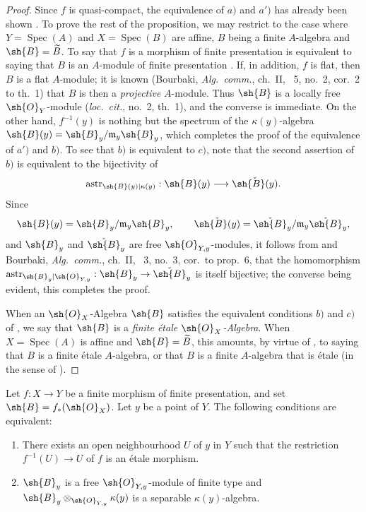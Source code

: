 \begin{proof}
Since $f$ is quasi-compact, the equivalence of $a)$ and $a')$ has already been shown .
To prove the rest of the proposition, we may restrict to the case where $Y=\operatorname{Spec}(A)$ and $X=\operatorname{Spec}(B)$ are affine, $B$ being a finite $A$-algebra and $\sh{B}=\widetilde{B}$.
To say that $f$ is a morphism of finite presentation is equivalent to saying that $B$ is an $A$-module of finite presentation .
If, in addition, $f$ is flat, then $B$ is a flat $A$-module; it is known (Bourbaki, \emph{Alg.\ comm.}, ch.~II, \textsection~5, no.~2, cor.~2 to th.~1) that $B$ is then a \emph{projective} $A$-module.  Thus $\sh{B}$ is a locally free $\sh{O}_Y$-module (\emph{loc.\ cit.}, no.~2, th.~1), and the converse is immediate.
On the other hand, $f^{-1}(y)$ is nothing but the spectrum of the $\kappa(y)$-algebra $\sh{B}(y)=\sh{B}_y/\mathfrak{m}_y\sh{B}_y$, which completes the proof of the equivalence of $a')$ and $b)$.
To see that $b)$ is equivalent to $c)$, note that the second assertion of $b)$ is equivalent to the bijectivity of
\[
 \operatorname{astr}_{\sh{B}(y)|\kappa(y)}:\sh{B}(y)\longrightarrow\check{\sh{B}(y)}.
\]
Since
\[
 \sh{B}(y)=\sh{B}_y/\mathfrak{m}_y\sh{B}_y,
 \qquad
 \check{\sh{B}(y)}=\check{\sh{B}}_y/\mathfrak{m}_y\check{\sh{B}}_y,
\]
and $\sh{B}_y$ and $\check{\sh{B}}_y$ are free $\sh{O}_{Y,y}$-modules, it follows from  and Bourbaki, \emph{Alg.\ comm.}, ch.~II, \textsection~3, no.~3, cor.\ to prop.~6, that the homomorphism $\operatorname{astr}_{\sh{B}_y|\sh{O}_{Y,y}}:\sh{B}_y\to\check{\sh{B}}_y$ is itself bijective;
the converse being evident, this completes the proof.

When an $\sh{O}_X$-Algebra $\sh{B}$ satisfies the equivalent conditions $b)$ and $c)$ of , we say that $\sh{B}$ is a \emph{finite \'etale $\sh{O}_X$-Algebra}.
When $X=\operatorname{Spec}(A)$ is affine and $\sh{B}=\widetilde{B}$, this amounts, by virtue of , to saying that $B$ is a finite \'etale $A$-algebra, or that $B$ is a finite $A$-algebra that is \'etale (in the sense of ).
\end{proof}

\begin{corollary}[18.2.4]
\label{IV.18.2.4}
Let $f:X\to Y$ be a finite morphism of finite presentation, and set $\sh{B}=f_*(\sh{O}_X)$.
Let $y$ be a point of $Y$.
The following conditions are equivalent:
\begin{enumerate}[label=\emph{\alph*)}]
  \item There exists an open neighbourhood $U$ of $y$ in $Y$ such that the restriction $f^{-1}(U)\to U$ of $f$ is an \'etale morphism.
  \item $\sh{B}_y$ is a free $\sh{O}_{Y,y}$-module of finite type and $\sh{B}_y\otimes_{\sh{O}_{Y,y}}\kappa(y)$ is a separable $\kappa(y)$-algebra.
\end{enumerate}
\end{corollary}

